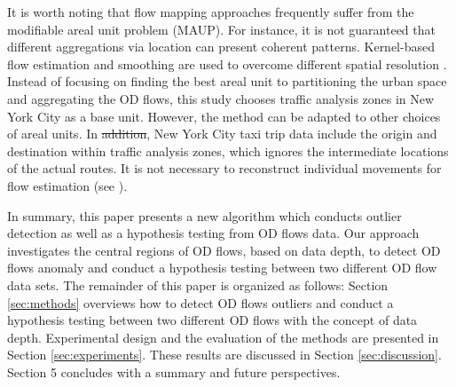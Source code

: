 \documentclass[a4paper,UKenglish]{lipics-v2016}
\providecommand{\DIFadd}[1]{{\protect\color{blue}\uwave{#1}}} %
\providecommand{\DIFdel}[1]{{\protect\color{red}\sout{#1}}}                      %
\providecommand{\DIFaddbegin}{} %
\providecommand{\DIFaddend}{} %
\providecommand{\DIFdelbegin}{} %
\providecommand{\DIFdelend}{} %
\begin{document}
It is worth noting that flow mapping approaches frequently suffer from the modifiable areal unit problem (MAUP). For instance, it is not guaranteed that different aggregations via location can present coherent patterns.
Kernel-based flow estimation and smoothing are used to overcome different spatial resolution \cite{guo14IEEETVCG}. 
Instead of focusing on finding the best areal unit to partitioning the urban space and aggregating the OD flows, this study chooses traffic analysis zones in New York City as a base unit. However, the method can be adapted to other choices of areal units.
In \DIFdelbegin \DIFdel{addition}\DIFdelend \DIFaddbegin \DIFadd{this study}\DIFaddend , New York City taxi trip data include the origin and destination within traffic analysis zones, which ignores the intermediate locations of the actual routes.
It is not necessary to reconstruct individual movements for flow estimation (see \cite{duckham16ICGIS}).

In summary, this paper presents a new algorithm which conducts outlier detection as well as a hypothesis testing from OD flows data. Our approach investigates the central regions of OD flows, based on data depth, to detect OD flows anomaly and conduct a hypothesis testing between two different OD flow data sets. The remainder of this paper is organized as follows: Section \ref{sec:methods} overviews how to detect OD flows outliers and conduct  a hypothesis testing between two different OD flows with the concept of data depth. 
Experimental design and the evaluation of the methods are presented in Section \ref{sec:experiments}. 
These results are discussed in Section \ref{sec:discussion}. 
Section 5 concludes with a summary and future perspectives.

%
\end{document}
